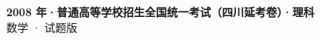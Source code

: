 \documentclass[zihao=-4, a4paper]{ctexart}
\begin{document}
\begin{center}
  {\Large\bfseries 2008 年·普通高等学校招生全国统一考试（四川延考卷）·理科}\\[4pt]
  {\large 数学 · 试题版}
\end{center}
\medskip
{}

\end{document}
